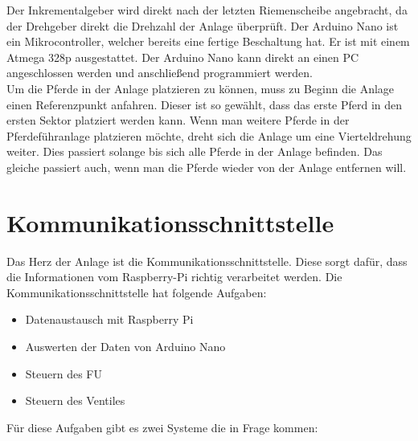 Der Inkrementalgeber wird direkt nach der letzten Riemenscheibe angebracht, da der Drehgeber direkt die Drehzahl der Anlage überprüft. Der Arduino Nano ist ein Mikrocontroller, welcher bereits eine fertige Beschaltung hat. Er ist mit einem Atmega 328p ausgestattet. Der Arduino Nano kann direkt an einen PC angeschlossen werden und anschließend programmiert werden. \\
Um die Pferde in der Anlage platzieren zu können, muss zu Beginn die Anlage einen Referenzpunkt anfahren. Dieser ist so gewählt, dass das erste Pferd in den ersten Sektor platziert werden kann. Wenn man weitere Pferde in der Pferdeführanlage platzieren möchte, dreht sich die Anlage um eine Vierteldrehung weiter. Dies passiert solange bis sich alle Pferde in der Anlage befinden. Das gleiche passiert auch, wenn man die Pferde wieder von der Anlage entfernen will. \\




\newpage
\section{Kommunikationsschnittstelle}
\label{sec:kommunikationsschnittstelle}

Das Herz der Anlage ist die Kommunikationsschnittstelle. Diese sorgt dafür, dass die Informationen vom Raspberry-Pi richtig verarbeitet werden. Die Kommunikationsschnittstelle hat folgende Aufgaben:

\begin{itemize}
	\item{Datenaustausch mit Raspberry Pi}
	\item{Auswerten der Daten von Arduino Nano}
	\item{Steuern des \ac{FU}}
	\item{Steuern des Ventiles}
\end{itemize}

Für diese Aufgaben gibt es zwei Systeme die in Frage kommen: 

